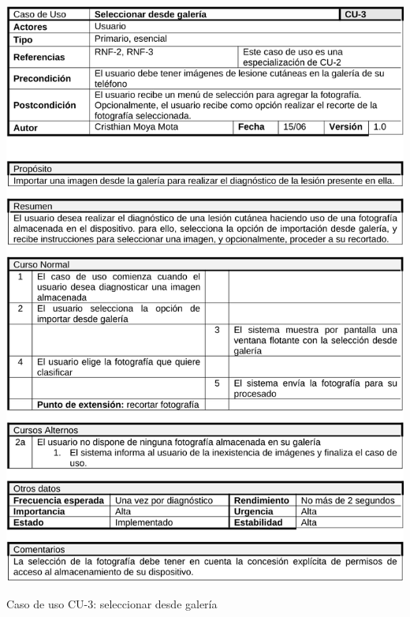   \begin{table}[H]
	\centering
	\includegraphics[scale=0.45]{imagenes/cu-3.png}
	\caption{Caso de uso CU-3: seleccionar desde galería}
	\label{fig:cu3}
\end{table}

